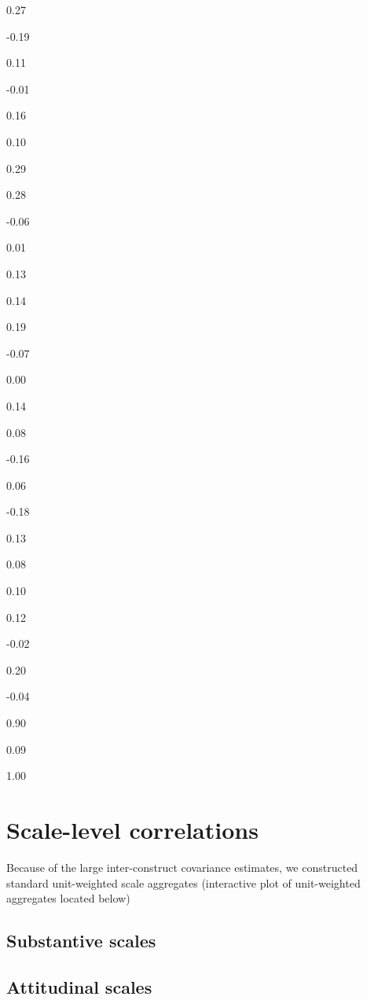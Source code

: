 \documentclass[
]{book}
\begin{document}
0.27

-0.19

0.11

-0.01

0.16

0.10

0.29

0.28

-0.06

0.01

0.13

0.14

0.19

-0.07

0.00

0.14

0.08

-0.16

0.06

-0.18

0.13

0.08

0.10

0.12

-0.02

0.20

-0.04

0.90

0.09

1.00

\hypertarget{scale-level-correlations}{%
\section{Scale-level correlations}\label{scale-level-correlations}}

Because of the large inter-construct covariance estimates, we constructed standard unit-weighted scale aggregates (interactive plot of unit-weighted aggregates located below)

\hypertarget{substantive-scales}{%
\subsection{Substantive scales}\label{substantive-scales}}

\hypertarget{htmlwidget-1aebcdc0661e677be057}{}

\hypertarget{attitudinal-scales}{%
\subsection{Attitudinal scales}\label{attitudinal-scales}}

\hypertarget{htmlwidget-3d30d3fa75c626ea7f73}{}
\end{document}
